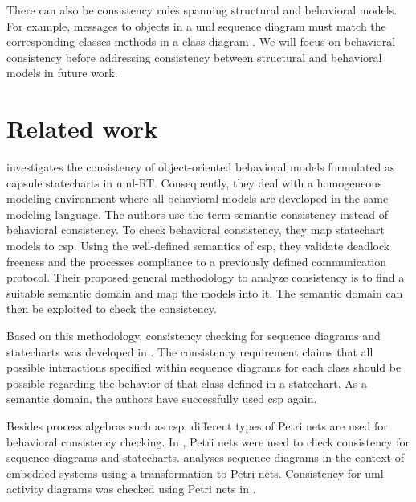 \documentclass[conference]{IEEEtran}
\begin{document}
There can also be consistency rules spanning structural and behavioral models.
For example, messages to objects in a \gls{uml} sequence diagram must match the corresponding classes methods in a class diagram \cite{egyedFixingInconsistenciesUML2007}.
We will focus on behavioral consistency before addressing consistency between structural and behavioral models in future work. 

\section{Related work} \label{sec:related_work}
\cite{engelsMethodologySpecifyingAnalyzing2001} investigates the consistency of object-oriented behavioral models formulated as capsule statecharts in \gls{uml}-RT.
Consequently, they deal with a homogeneous modeling environment where all behavioral models are developed in the same modeling language.
The authors use the term semantic consistency instead of behavioral consistency.
To check behavioral consistency, they map statechart models to \gls{csp}.
Using the well-defined semantics of \gls{csp}, they validate deadlock freeness and the processes compliance to a previously defined communication protocol.
Their proposed general methodology to analyze consistency is to find a suitable semantic domain and map the models into it.
The semantic domain can then be exploited to check the consistency.

Based on this methodology, consistency checking for sequence diagrams and statecharts was developed in \cite{kusterExplicitBehavioralConsistency2003}.
The consistency requirement claims that all possible interactions specified within sequence diagrams for each class should be possible regarding the behavior of that class defined in a statechart.
As a semantic domain, the authors have successfully used \gls{csp} again.

Besides process algebras such as \gls{csp}, different types of Petri nets are used for behavioral consistency checking.
In \cite{yaoConsistencyCheckingUML2006}, Petri nets were used to check consistency for sequence diagrams and statecharts.
\cite{cunhaFormalVerificationUML2011} analyses sequence diagrams in the context of embedded systems using a transformation to Petri nets.
Consistency for \gls{uml} activity diagrams was checked using Petri nets in \cite{thierry-miegUMLBehavioralConsistency2008}.
\end{document}
